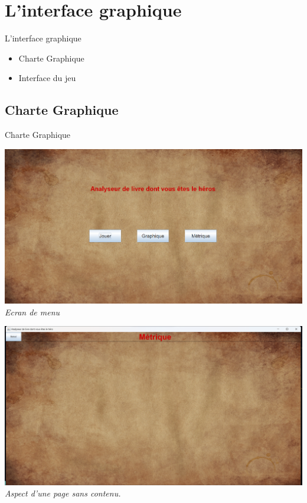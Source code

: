 \documentclass[aspectratio=169,xcolor=dvipsnames]{beamer}
\begin{document}
\section{L'interface graphique}
\begin{frame}{L'interface graphique}
    \begin{center}
    \begin{itemize}
        \item Charte Graphique
        \item Interface du jeu
    \end{itemize}
    \end{center}
\end{frame}

\subsection{Charte Graphique}
\begin{frame}{Charte Graphique}
        \begin{center}
            \begin{minipage}{.49\textwidth}
    \centering
        \includegraphics[width=\textwidth]{imgMenu.png}{\small\textsl{\\Ecran de menu }}
        \end{minipage}
        \begin{minipage}{.49\textwidth}
        \centering
        \includegraphics[width=\textwidth]{structureGUI.png}{\small\textsl{\\Aspect d'une page sans contenu.}}
    \end{minipage}
    \end{center}
\end{frame}
\end{document}
